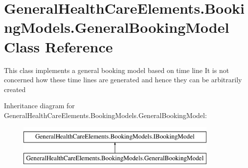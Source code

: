 \hypertarget{class_general_health_care_elements_1_1_booking_models_1_1_general_booking_model}{}\section{General\+Health\+Care\+Elements.\+Booking\+Models.\+General\+Booking\+Model Class Reference}
\label{class_general_health_care_elements_1_1_booking_models_1_1_general_booking_model}


This class implements a general booking model based on time line It is not concerned how these time lines are generated and hence they can be arbitrarily created  


Inheritance diagram for General\+Health\+Care\+Elements.\+Booking\+Models.\+General\+Booking\+Model\+:\begin{figure}[H]
\begin{center}
\leavevmode
\includegraphics[height=2.000000cm]{class_general_health_care_elements_1_1_booking_models_1_1_general_booking_model}
\end{center}
\end{figure}

